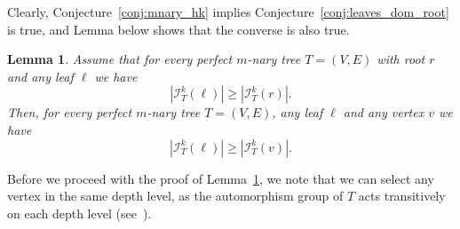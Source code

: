 \documentclass[10pt]{amsart}
\newtheorem{lemma}[theorem]{Lemma}
\theoremstyle{definition}
\begin{document}
Clearly, Conjecture~\ref{conj:mnary_hk} implies Conjecture~\ref{conj:leaves_dom_root} is true, and Lemma below shows that the converse is also true.
\begin{lemma}\label{lemma:leaves_dom_root}
	Assume that for every perfect $m$-nary  tree $T = (V, E)$ with root $r$ and any leaf $\ell$ we have $$|\mathcal{I}^k_T(\ell)| \geq  |\mathcal{I}^k_T(r)|.$$
	Then, for every perfect $m$-nary  tree $T = (V, E)$, any leaf $\ell$ and any vertex $v$ we have $$|\mathcal{I}^k_T(\ell)| \geq  |\mathcal{I}^k_T(v)|.$$
\end{lemma}

Before we proceed with the proof of Lemma~\ref{lemma:leaves_dom_root}, we note that we can select any vertex in the same depth level, as the automorphism group of $T$ acts transitively on each depth level (see~\cite[p.4]{Delizia2024OnVS}).

\vspace{1em}
\end{document}
